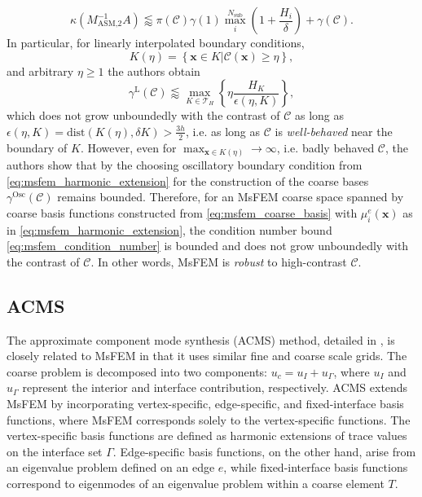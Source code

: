 \begin{equation}
    \kappa(M^{-1}_{\text{ASM,2}}A) \lessapprox \pi(\mathcal{C})\gamma(1)\max_i^{N_{\text{sub}}}\left(1+\frac{H_i}{\delta}\right) + \gamma(\mathcal{C}).
    \label{eq:msfem_condition_number}
\end{equation}
In particular, for linearly interpolated boundary conditions,
\[
    K(\eta) = \left\{\mathbf{x} \in K | \mathcal{C}(\mathbf{x}) \geq \eta\right\},
\]
and arbitrary $\eta\geq 1$ the authors obtain \cite[Theorem 4.3]{msfem_coarse_space_Graham_2007}
\[
    \gamma^{\text{L}}(\mathcal{C}) \lessapprox \max_{K\in\mathcal{T}_H} \left\{\eta\frac{H_K}{\epsilon(\eta,K)}\right\},
\]
which does not grow unboundedly with the contrast of $\mathcal{C}$ as long as $\epsilon(\eta,K) = \text{dist}(K(\eta),\delta K) > \frac{3h}{2}$, i.e. as long as $\mathcal{C}$ is \textit{well-behaved} near the boundary of $K$. However, even for $\max_{\mathbf{x}\in K(\eta)} \rightarrow \infty$, i.e. badly behaved $\mathcal{C}$, the authors show that by the choosing oscillatory boundary condition from \cref{eq:msfem_harmonic_extension} for the construction of the coarse bases $\gamma^{\text{Osc}}(\mathcal{C})$ remains bounded. Therefore, for an MsFEM coarse space spanned by coarse basis functions constructed from \cref{eq:msfem_coarse_basis} with $\mu^e_i(\mathbf{x})$ as in \cref{eq:msfem_harmonic_extension}, the condition number bound \cref{eq:msfem_condition_number} is bounded and does not grow unboundedly with the contrast of $\mathcal{C}$. In other words, MsFEM is \textit{robust} to high-contrast $\mathcal{C}$.

\subsection{ACMS}
The approximate component mode synthesis (ACMS) method, detailed in \cite{acms_coarse_space_Heinlein2018}, is closely related to MsFEM in that it uses similar fine and coarse scale grids. The coarse problem is decomposed into two components: $u_c = u_I + u_{\Gamma}$, where $u_I$ and $u_{\Gamma}$ represent the interior and interface contribution, respectively. ACMS extends MsFEM by incorporating vertex-specific, edge-specific, and fixed-interface basis functions, where MsFEM corresponds solely to the vertex-specific functions. The vertex-specific basis functions are defined as harmonic extensions of trace values on the interface set $\Gamma$. Edge-specific basis functions, on the other hand, arise from an eigenvalue problem defined on an edge $e$, while fixed-interface basis functions correspond to eigenmodes of an eigenvalue problem within a coarse element $T$.

